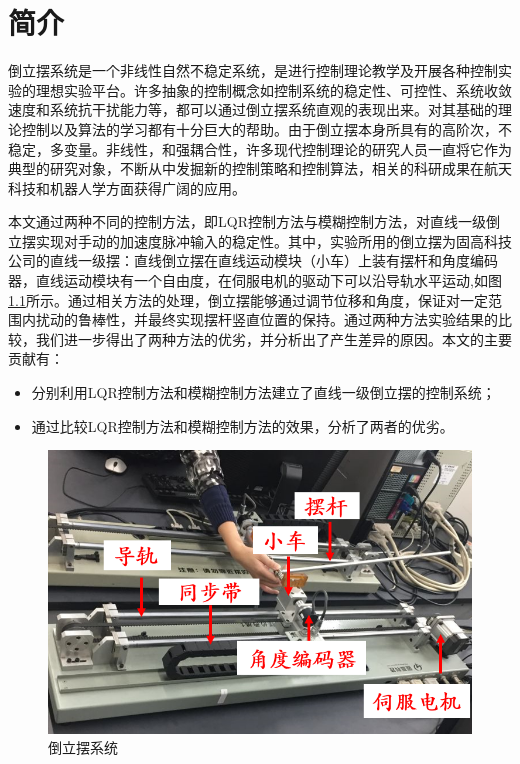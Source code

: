 \chapter{简介}
倒立摆系统是一个非线性自然不稳定系统，是进行控制理论教学及开展各种控制实验的理想实验平台。许多抽象的控制概念如控制系统的稳定性、可控性、系统收敛速度和系统抗干扰能力等，都可以通过倒立摆系统直观的表现出来。对其基础的理论控制以及算法的学习都有十分巨大的帮助。由于倒立摆本身所具有的高阶次，不稳定，多变量。非线性，和强耦合性，许多现代控制理论的研究人员一直将它作为典型的研究对象，不断从中发掘新的控制策略和控制算法，相关的科研成果在航天科技和机器人学方面获得广阔的应用。

本文通过两种不同的控制方法，即LQR控制方法与模糊控制方法，对直线一级倒立摆实现对手动的加速度脉冲输入的稳定性。其中，实验所用的倒立摆为固高科技公司的直线一级摆：直线倒立摆在直线运动模块（小车）上装有摆杆和角度编码器，直线运动模块有一个自由度，在伺服电机的驱动下可以沿导轨水平运动,如图\ref{fig:realthing}所示。通过相关方法的处理，倒立摆能够通过调节位移和角度，保证对一定范围内扰动的鲁棒性，并最终实现摆杆竖直位置的保持。通过两种方法实验结果的比较，我们进一步得出了两种方法的优劣，并分析出了产生差异的原因。本文的主要贡献有：
  \begin{itemize}
    \item 分别利用LQR控制方法和模糊控制方法建立了直线一级倒立摆的控制系统；
    \item 通过比较LQR控制方法和模糊控制方法的效果，分析了两者的优劣。
  \end{itemize}

\begin{figure}[hbpt]
\centering
\includegraphics[width=12cm]{realthing.png}
\caption{倒立摆系统}\label{fig:realthing}
\end{figure}



